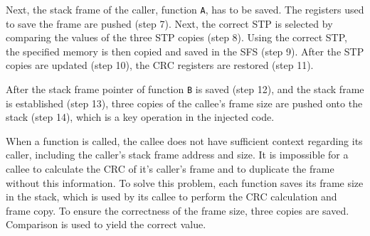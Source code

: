 Next, the stack frame of the caller, function \texttt{A}, has to be saved. The registers used to save the frame are pushed (step 7). Next, the correct STP is selected by comparing the values of the three STP copies (step 8). Using the correct STP, the specified memory is then copied and saved in the SFS (step 9). After the STP copies are updated (step 10), the CRC registers are restored (step 11).

After the stack frame pointer of function \texttt{B} is saved (step 12), and the stack frame is established (step 13), three copies of the callee's frame size are pushed onto the stack (step 14), which is a key operation in the injected code. 

When a function is called, the callee does not have sufficient context regarding its caller, including the caller's stack frame address and size. It is impossible for a callee to calculate the CRC of it's caller's frame and to duplicate the frame without this information. To solve this problem, each function saves its frame size in the stack, which is used by its callee to perform the CRC calculation and frame copy. To ensure the correctness of the frame size, three copies are saved. Comparison is used to yield the correct value. 
\vspace{-10pt}
